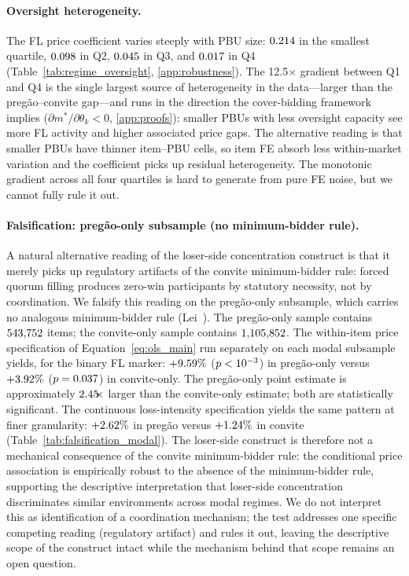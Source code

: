 \paragraph{Oversight heterogeneity.}
The FL price coefficient varies steeply with PBU size: $0.214$
in the smallest quartile, $0.098$ in Q2, $0.045$ in Q3, and
$0.017$ in Q4 (Table~\ref{tab:regime_oversight},
\ref{app:robustness}). The 12.5$\times$ gradient between Q1
and Q4 is the single largest source of heterogeneity in the
data---larger than the preg\~ao--convite gap---and runs in the
direction the cover-bidding framework implies
($\partial m^*/\partial \theta_k < 0$, \ref{app:proofs}):
smaller PBUs with less oversight capacity see more FL activity
and higher associated price gaps. The alternative reading is
that smaller PBUs have thinner item--PBU cells, so item FE
absorb less within-market variation and the coefficient picks
up residual heterogeneity. The monotonic gradient across all
four quartiles is hard to generate from pure FE noise, but we
cannot fully rule it out.

\paragraph{Falsification: pregão-only subsample (no minimum-bidder rule).}
A natural alternative reading of the loser-side concentration
construct is that it merely picks up regulatory artifacts of
the convite minimum-bidder rule: forced quorum filling produces
zero-win participants by statutory necessity, not by
coordination. We falsify this reading on the pregão-only
subsample, which carries no analogous minimum-bidder rule
(Lei~\valLeiPregao). The pregão-only sample contains
$543{,}752$ items; the convite-only sample contains
$1{,}105{,}852$. The within-item price specification of
Equation~\eqref{eq:ols_main} run separately on each modal
subsample yields, for the binary FL marker: $+9.59\%$
($p < 10^{-3}$) in pregão-only versus $+3.92\%$
($p = 0.037$) in convite-only. The pregão-only point
estimate is approximately $2.45\!\!\times$ larger than
the convite-only estimate; both are statistically significant.
The continuous loss-intensity specification yields the same
pattern at finer granularity: $+2.62\%$ in pregão versus
$+1.24\%$ in convite (Table~\ref{tab:falsification_modal}).
The loser-side construct is therefore not a mechanical
consequence of the convite minimum-bidder rule: the
conditional price association is empirically robust to the
absence of the minimum-bidder rule, supporting the descriptive
interpretation that loser-side concentration discriminates
similar environments across modal regimes. We do not interpret
this as identification of a coordination mechanism; the test
addresses one specific competing reading (regulatory artifact)
and rules it out, leaving the descriptive scope of the
construct intact while the mechanism behind that scope
remains an open question.

